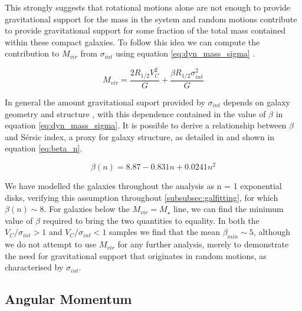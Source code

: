\documentclass[fleqn,usenatbib]{mn2e}
\newcommand{\Sers}{S\'{e}rsic }
\begin{document}
This strongly suggests that rotational motions alone are not enough to provide gravitational support for the mass in the system and random motions contribute to provide gravitational support for some fraction of the total mass contained within these compact galaxies.
To follow this idea we can compute the contribution to $M_{vir}$ from $\sigma_{int}$ using equation \ref{eq:dyn_mass_sigma} \citep[e.g.][]{Cappellari2006}.

\begin{equation}\label{eq:dyn_mass_sigma}
   M_{vir} = \frac{2R_{1/2}V_{C}^{2}}{G} + \frac{\beta R_{1/2}\sigma_{int}^{2}}{G}
\end{equation}     

In general the amount gravitational suport provided by $\sigma_{int}$ depends on galaxy geometry and structure \citep[e.g.][]{Cappellari2006,Belli2014}, with this dependence contained in the value of $\beta$ in equation \ref{eq:dyn_mass_sigma}.
It is possible to derive a relationship between $\beta$ and \Sers index, a proxy for galaxy structure, as detailed in \cite{Cappellari2006} and shown in equation \ref{eq:beta_n}.

\begin{equation}\label{eq:beta_n}
   \beta(n) = 8.87 - 0.831n + 0.0241n^{2}
\end{equation} 


We have modelled the galaxies throughout the analysis as n = 1 exponential disks, verifying this assumption throughout \cref{subsubsec:galfitting}, for which $\beta(n) \sim 8$.
For galaxies below the $M_{vir} = M_{\star}$ line, we can find the minimum value of $\beta$ required to bring the two quantities to equality.
In both the $V_{C}/\sigma_{int} > 1$ and $V_{C}/\sigma_{int} < 1$ samples we find that the mean $\beta_{min}\sim 5$, although we do not attempt to use $M_{vir}$ for any further analysis, merely to demonstrate the need for gravitational support that originates in random motions, as characterised by $\sigma_{int}$.

\subsection{Angular Momentum}\label{subsec:ang_mom}
\end{document}
